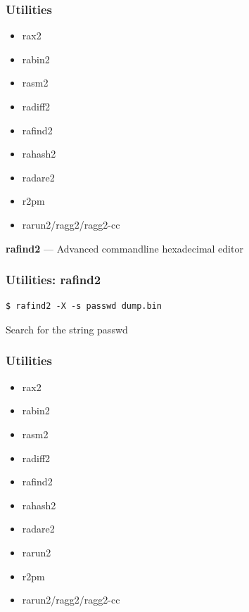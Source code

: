 \documentclass[10pt,pdf,utf8,english,compress,hyperref={unicode}]{beamer}
\begin{document}
\begin{frame}[fragile]
  \frametitle{Utilities}
     \begin{itemize}
        \item rax2
        \item rabin2
        \item rasm2
        \item radiff2
        \item \alert{rafind2}
        \item rahash2
        \item radare2
				\item r2pm
        \item rarun2/ragg2/ragg2-cc
      \end{itemize}
\end{frame}

\begin{frame}[fragile]
  \center\textbf{rafind2} — Advanced commandline hexadecimal editor
  \noindent\makebox[\linewidth]{\rule{\paperwidth}{0.4pt}}
  \frametitle{Utilities: rafind2}
  \begin{verbatim}$ rafind2 -X -s passwd dump.bin\end{verbatim}
  \alert{Search for the string passwd}

\end{frame}

\begin{frame}[fragile]
  \frametitle{Utilities}
     \begin{itemize}
        \item rax2
        \item rabin2
        \item rasm2
        \item radiff2
        \item rafind2
        \item \alert{rahash2}
        \item radare2
        \item rarun2
				\item r2pm
        \item rarun2/ragg2/ragg2-cc
      \end{itemize}
\end{frame}
\end{document}
